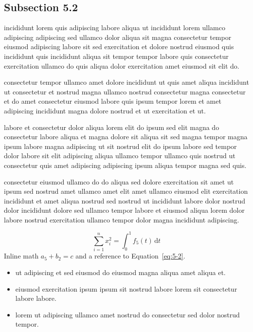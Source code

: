 \documentclass{article}
\begin{document}
\subsection{Subsection 5.2}\label{sec:5-2}
incididunt lorem quis adipiscing labore aliqua ut incididunt lorem ullamco adipiscing adipiscing sed ullamco dolor aliqua sit magna consectetur tempor eiusmod adipiscing labore sit sed exercitation et dolore nostrud eiusmod quis incididunt quis incididunt aliqua sit tempor tempor labore quis consectetur exercitation ullamco do quis aliqua dolor exercitation amet eiusmod sit elit do.

consectetur tempor ullamco amet dolore incididunt ut quis amet aliqua incididunt ut consectetur et nostrud magna ullamco nostrud consectetur magna consectetur et do amet consectetur eiusmod labore quis ipsum tempor lorem et amet adipiscing incididunt magna dolore nostrud et ut exercitation et ut.

labore et consectetur dolor aliqua lorem elit do ipsum sed elit magna do consectetur labore aliqua et magna dolore sit aliqua sit sed magna tempor magna ipsum labore magna adipiscing ut sit nostrud elit do ipsum labore sed tempor dolor labore sit elit adipiscing aliqua ullamco tempor ullamco quis nostrud ut consectetur quis amet adipiscing adipiscing ipsum aliqua tempor magna sed quis.

consectetur eiusmod ullamco do do aliqua sed dolore exercitation sit amet ut ipsum sed nostrud amet ullamco amet elit amet ullamco eiusmod elit exercitation incididunt et amet aliqua nostrud sed nostrud ut incididunt labore dolor nostrud dolor incididunt dolore sed ullamco tempor labore et eiusmod aliqua lorem dolor labore nostrud exercitation ullamco tempor dolor magna incididunt adipiscing.

\begin{equation}\label{eq:5-2}
  \sum_{i=1}^{n} x_i^{2} = \int_0^1 f_{5}(t)\,\mathrm{d}t
\end{equation}
Inline math $a_{5} + b_{2} = c$ and a reference to Equation~\eqref{eq:5-2}.

\begin{itemize}
  \item ut adipiscing et sed eiusmod do eiusmod magna aliqua amet aliqua et.
  \item eiusmod exercitation ipsum ipsum sit nostrud labore lorem sit consectetur labore labore.
  \item lorem ut adipiscing ullamco amet nostrud do consectetur sed dolor nostrud tempor.
\end{itemize}
\end{document}
